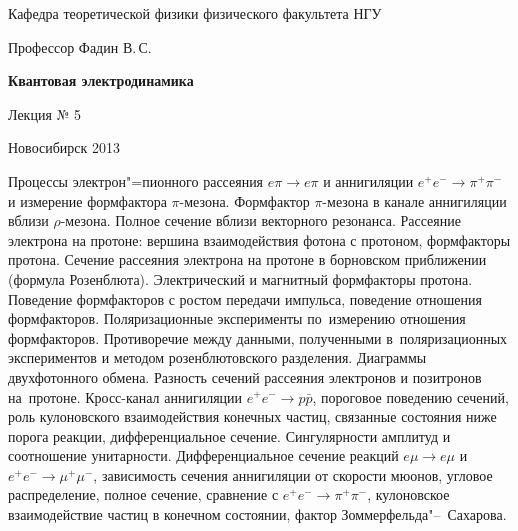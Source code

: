 \documentclass[12pt,pagesize,paper=landscape,paper=192mm:108mm]{scrbook}
\begin{document}
\begin{titlepage}
\begin{center}
    Кафедра теоретической физики физического факультета НГУ
    \medskip

    \Large
    Профессор Фадин В.\,С.
    \bigskip

    \huge
    \textbf{Квантовая электродинамика}
    \bigskip

    \Large
    Лекция № 5
    \vfill

    \normalsize
    \vfill

    \normalsize \ccbysa\hspace{0.5em}  Новосибирск 2013
  \end{center}
\end{titlepage}
\vspace*{-1em}
\begin{center}
\vfill
  \begin{minipage}{0.85\linewidth}
    Процессы электрон"=пионного рассеяния $e \pi \to e \pi$ и
    аннигиляции $e^+e^-\to\pi^+\pi^-$ и измерение формфактора
    $\pi$-мезона. Формфактор $\pi$-мезона в канале аннигиляции вблизи
    $\rho$-мезона. Полное сечение вблизи векторного резонанса.
    Рассеяние электрона на протоне: вершина взаимодействия фотона с
    протоном, формфакторы протона. Сечение рассеяния электрона на
    протоне в борновском приближении (формула
    Розенблюта). Электрический и магнитный формфакторы
    протона. Поведение формфакторов с ростом передачи импульса,
    поведение отношения формфакторов. Поляризационные эксперименты
    по~измерению отношения формфакторов. Противоречие между данными,
    полученными в~поляризационных экспериментов и методом
    розенблютовского разделения.  Диаграммы двухфотонного
    обмена. Разность сечений рассеяния электронов и позитронов
    на~протоне. Кросс-канал аннигиляции $e^+e^- \to p\bar{p}$,
    пороговое поведению сечений, роль кулоновского взаимодействия
    конечных частиц, связанные состояния ниже порога реакции,
    дифференциальное сечение. Сингулярности амплитуд и соотношение
    унитарности.  Дифференциальное сечение реакций $e\mu \to e\mu$ и
    $e^+e^- \to \mu^+\mu^-$, зависимость сечения аннигиляции от
    скорости мюонов, угловое распределение, полное сечение, сравнение
    с $e^+e^- \to \pi^+\pi^-$, кулоновское взаимодействие частиц в
    конечном состоянии, фактор Зоммерфельда"--~Сахарова.
  \end{minipage}
  \vfill

\end{center}
\end{document}
